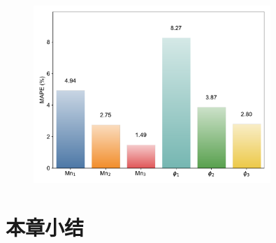\begin{figure}[htbp]
  \centering
  \includegraphics[width=0.8\textwidth]{Fig/MAPE_bar_chart.pdf}
\end{figure}

\section{本章小结}
